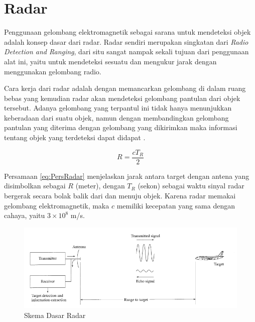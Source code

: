 
\section{Radar}

Penggunaan gelombang elektromagnetik sebagai sarana untuk mendeteksi objek adalah konsep dasar dari radar. Radar sendiri merupakan singkatan dari \textit{Radio Detection and Ranging}, dari situ sangat nampak sekali tujuan dari penggunaan alat ini, yaitu untuk mendeteksi sesuatu dan mengukur jarak dengan menggunakan gelombang radio. 

Cara kerja dari radar adalah dengan memancarkan gelombang di dalam ruang bebas yang kemudian radar akan mendeteksi gelombang pantulan dari objek tersebut. Adanya gelombang yang terpantul ini tidak hanya menunjukkan keberadaan dari suatu objek, namun dengan membandingkan gelombang pantulan yang diterima dengan gelombang yang dikirimkan maka informasi tentang objek yang terdeteksi dapat didapat \cite{Skolnik2001}.

\begin{equation}
	R = \frac{cT_{R}}{2}
	\label{eq:PersRadar}
\end{equation}

Persamaan \ref{eq:PersRadar} menjelaskan jarak antara target dengan antena yang disimbolkan sebagai $R$ (meter), dengan $T_{R}$ (sekon) sebagai waktu sinyal radar bergerak secara bolak balik dari dan menuju objek. Karena radar memakai gelombang elektromagnetik, maka $c$ memiliki kecepatan yang sama dengan cahaya, yaitu $3 \times 10 ^{8} $ m/s.

\begin{figure}
	\begin{center}
		\includegraphics[scale=0.45]{pics/bab2/skemaradar.png} 
		\caption[Skema Dasar Radar]{{Skema Dasar Radar} \cite{Skolnik2001}}
		\label{pic:skemaRadar}
	\end{center}
\end{figure}

